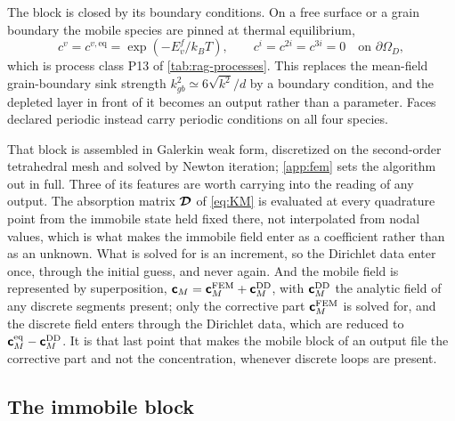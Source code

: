 The block is closed by its boundary conditions. On a free surface or a grain
boundary the mobile species are pinned at thermal equilibrium,
\begin{equation}
  c^{v}=c^{v,\mathrm{eq}}=\exp(-E^{f}_v/k_BT),
  \qquad
  c^{i}=c^{2i}=c^{3i}=0 \quad\text{on }\partial\Omega_D,
  \label{eq:bc}
\end{equation}
which is process class P13 of \cref{tab:rag-processes}. This replaces the
mean-field grain-boundary sink strength $k^2_{gb}\simeq6\sqrt{k^2}/d$ by a
boundary condition, and the depleted layer in front of it becomes an output
rather than a parameter. Faces declared periodic instead carry periodic
conditions on all four species.

That block is assembled in Galerkin weak form, discretized on the second-order
tetrahedral mesh and solved by Newton iteration; \cref{app:fem} sets the
algorithm out in full. Three of its features are worth carrying into the
reading of any output. The absorption matrix $\bm{\mathcal{D}}$ of \cref{eq:KM} is
evaluated at every quadrature point from the immobile state held fixed there,
not interpolated from nodal values, which is what makes the immobile field
enter as a coefficient rather than as an unknown. What is solved for is an
increment, so the Dirichlet data enter once, through the initial guess, and
never again. And the mobile field is represented by superposition,
$\bm{\mathsf{c}}_M=\bm{\mathsf{c}}_M^{\mathrm{FEM}}+\bm{\mathsf{c}}_M^{\mathrm{DD}}$, with
$\bm{\mathsf{c}}_M^{\mathrm{DD}}$ the analytic field of any discrete segments present;
only the corrective part $\bm{\mathsf{c}}_M^{\mathrm{FEM}}$ is solved for, and the
discrete field enters through the Dirichlet data, which are reduced to
$\bm{\mathsf{c}}_M^{\mathrm{eq}}-\bm{\mathsf{c}}_M^{\mathrm{DD}}$. It is that last point that
makes the mobile block of an output file the corrective part and not the
concentration, whenever discrete loops are present.

\subsection{The immobile block}
\label{sec:immobile}

